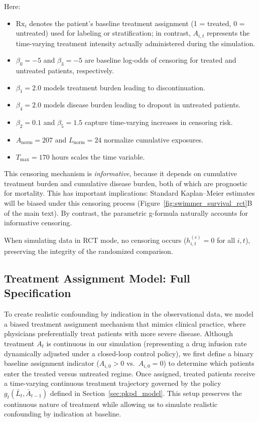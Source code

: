 Here:
\begin{itemize}
    \item $\text{Rx}_i$ denotes the patient's baseline treatment assignment 
    (1 = treated, 0 = untreated) used for labeling or stratification; 
    in contrast, $A_{i,t}$ represents the time-varying treatment intensity 
    actually administered during the simulation.
    \item $\beta_0 = -5$ and $\beta_3 = -5$ are baseline log-odds of censoring 
    for treated and untreated patients, respectively.
    \item $\beta_1 = 2.0$ models treatment burden leading to discontinuation.
    \item $\beta_4 = 2.0$ models disease burden leading to dropout in untreated patients.
    \item $\beta_2 = 0.1$ and $\beta_5 = 1.5$ capture time-varying increases in censoring risk.
    \item $A_{\mathrm{norm}} = 207$ and $L_{\mathrm{norm}} = 24$ normalize cumulative exposures.
    \item $T_{\max} = 170$ hours scales the time variable.
\end{itemize}

This censoring mechanism is \emph{informative}, because it depends on cumulative treatment burden and cumulative disease burden, both of which are prognostic for mortality. This has important implications: Standard Kaplan--Meier estimates will be biased under this censoring process (Figure~\ref{fig:swimmer_survival_rct}B of the main text). By contrast, the parametric g-formula naturally accounts for informative censoring.

When simulating data in RCT mode, no censoring occurs (\( h^{(c)}_{i,t} = 0 \) for all \( i,t \)), preserving the integrity of the randomized comparison.


\subsection{Treatment Assignment Model: Full Specification}


To create realistic confounding by indication in the observational data, we model a biased treatment assignment mechanism that mimics clinical practice, where physicians preferentially treat patients with more severe disease. 
Although treatment $A_t$ is continuous in our simulation (representing a drug infusion rate dynamically adjusted under a closed-loop control policy), we first define a binary baseline assignment indicator 
($A_{i,0} > 0$ vs.\ $A_{i,0} = 0$) to determine which patients enter the treated versus untreated regime. 
Once assigned, treated patients receive a time-varying continuous treatment trajectory governed by the policy $g_t(\bar{L}_t, \bar{A}_{t-1})$ defined in Section~\ref{sec:pkpd_model}. 
This setup preserves the continuous nature of treatment while allowing us to simulate realistic confounding by indication at baseline.

